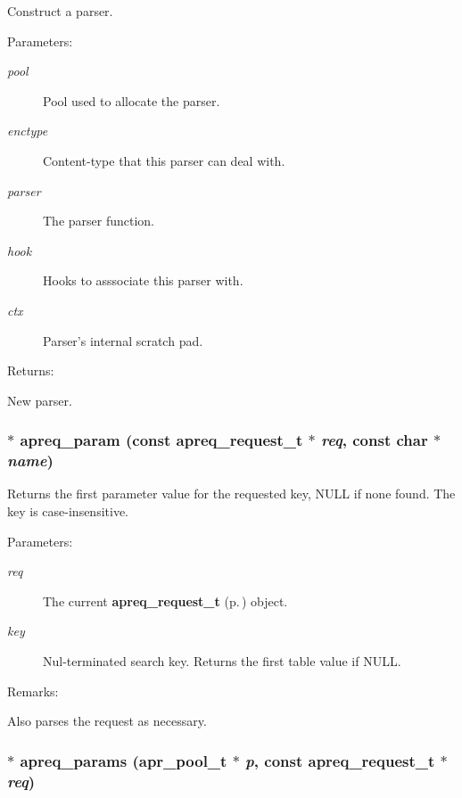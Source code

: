 Construct a parser.\begin{Desc}
\item[Parameters: ]\par
\begin{description}
\item[{\em 
pool}]Pool used to allocate the parser. \item[{\em 
enctype}]Content-type that this parser can deal with. \item[{\em 
parser}]The parser function. \item[{\em 
hook}]Hooks to asssociate this parser with. \item[{\em 
ctx}]Parser's internal scratch pad. \end{description}
\end{Desc}
\begin{Desc}
\item[Returns: ]\par
New parser. \end{Desc}
\subsubsection{$\ast$ apreq\_\-param (const {\bf apreq\_\-request\_\-t} $\ast$ {\em req}, const char $\ast$ {\em name})}\label{group__params_a6}


Returns the first parameter value for the requested key, NULL if none found. The key is case-insensitive. \begin{Desc}
\item[Parameters: ]\par
\begin{description}
\item[{\em 
req}]The current {\bf apreq\_\-request\_\-t} {\rm (p.\,\pageref{structapreq__request__t})} object. \item[{\em 
key}]Nul-terminated search key. Returns the first table value  if NULL. \end{description}
\end{Desc}
\begin{Desc}
\item[Remarks: ]\par
Also parses the request as necessary. \end{Desc}
\subsubsection{$\ast$ apreq\_\-params ({\bf apr\_\-pool\_\-t} $\ast$ {\em p}, const {\bf apreq\_\-request\_\-t} $\ast$ {\em req})}\label{group__params_a7}


